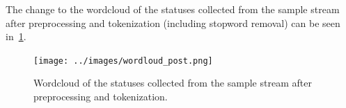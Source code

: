 The change to the wordcloud of the statuses collected from the sample stream after preprocessing and tokenization (including stopword removal) can be seen in~\ref{fig:wordloud_post}.

\begin{figure}
    \centering
    \caption{Wordcloud of the statuses collected from the sample stream after preprocessing and tokenization.}
    \label{fig:wordloud_post}
    \texttt{[image: ../images/wordloud\_post.png]} %
\end{figure}